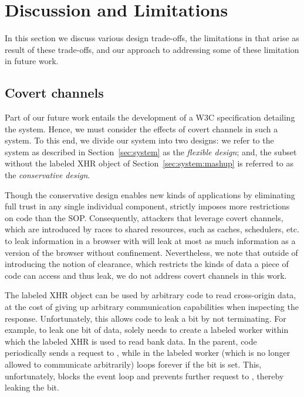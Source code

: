\section{Discussion and Limitations}
\label{sec:discussion}

In this section we discuss various design trade-offs, the limitations
in \sys{} that arise as result of these trade-offs, and our approach
to addressing some of these limitation in future work.


\subsection{Covert channels}
\label{sec:discussion:covert}

Part of our future work entails the development of a W3C
specification detailing the \sys{} system.
%
Hence, we must consider the effects of covert channels in such a
system.
%
To this end, we divide our system into two designs:
%
we refer to the system as described in
Section~\ref{sec:system} as the \emph{flexible design};
and, the subset without the labeled XHR object of
Section~\ref{sec:system:mashup} is referred to as the
\emph{conservative design}.

Though the conservative \sys{} design enables new kinds of
applications by eliminating full trust in any single individual
component, \sys{} strictly imposes more restrictions on code than the
SOP.
%
Consequently, attackers that leverage covert channels, which are
introduced by races to shared resources, such as caches, schedulers,
etc. to leak information in a browser with \sys{} will leak at most as
much information as a version of the browser without confinement.
%
Nevertheless, we note that outside of introducing the notion of
clearance, which restricts the kinds of data a piece of code can
access and thus leak, we do not address covert channels in this work. 

%


The labeled XHR object can be used by arbitrary code to read cross-origin
data, at the cost of giving up arbitrary communication capabilities
when inspecting the response.
%
Unfortunately, this allows code to leak a bit by not terminating.
%
For example, to leak one bit of  data, 
solely needs to create a labeled worker within which the labeled XHR
is used to read bank data.
%
In the parent, code periodically sends a request to ,
while in the labeled worker (which is no longer allowed to communicate
arbitrarily) loops forever if the bit is set.
%
This, unfortunately, blocks the event loop and prevents further
request to , thereby leaking the bit.


